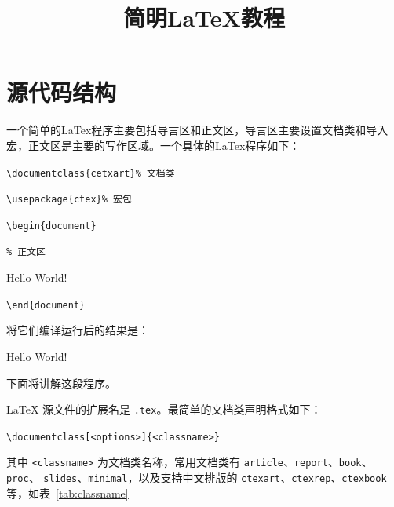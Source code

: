 \documentclass[12pt,a4paper]{ctexart}
\title{简明LaTeX教程}
\author{}
\date{}
\begin{document}
\setlength{\emergencystretch}{3em}

\maketitle
\clearpage

\tableofcontents
\clearpage


\section{源代码结构}
一个简单的LaTex程序主要包括导言区和正文区，导言区主要设置文档类和导入宏，正文区是主要的写作区域。一个具体的LaTex程序如下：

\texttt{\textbackslash documentclass\{cetxart\}}\texttt{\% 文档类}

\texttt{\textbackslash usepackage\{ctex\}}\texttt{\% 宏包}

\texttt{\textbackslash begin\{document\}}

\texttt{\% 正文区}

Hello World!

\texttt{\textbackslash end\{document\}}

将它们编译运行后的结果是：

Hello World!

下面将讲解这段程序。

LaTeX 源文件的扩展名是 \texttt{.tex}。最简单的文档类声明格式如下：

\begin{center}
  \texttt{\textbackslash documentclass[<options>]\{<classname>\}}
\end{center}

其中 \texttt{<classname>} 为文档类名称，常用文档类有
\texttt{article}、\texttt{report}、\texttt{book}、\texttt{proc}、
\texttt{slides}、\texttt{minimal}，以及支持中文排版的
\texttt{ctexart}、\texttt{ctexrep}、\texttt{ctexbook} 等，如表~\ref{tab:classname}
\end{document}
